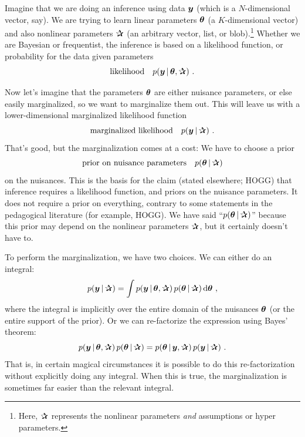 Imagine that we are doing an inference using data $\boldsymbol{y}$ (which is a
$N$-dimensional vector, say).
We are trying to learn linear parameters $\boldsymbol{\theta}$ (a $K$-dimensional vector)
and also nonlinear parameters $\bP$ (an arbitrary vector, list, or
blob).\footnote{Here, $\bP$ represents the nonlinear parameters \emph{and}
assumptions or hyper parameters.}
Whether we are Bayesian or frequentist, the inference is based on
a likelihood function, or probability for the data given parameters
\begin{equation}
\mbox{likelihood} \quad p(\vy\given\vtheta,\bP) ~ .
\end{equation}

Now let's imagine that the parameters $\boldsymbol{\theta}$ are either nuisance
parameters, or else easily marginalized, so we want to marginalize
them out.
This will leave us with a lower-dimensional marginalized likelihood
function
\begin{equation}
\mbox{marginalized likelihood} \quad p(\vy\given\bP) ~ .
\end{equation}
That's good, but the marginalization comes at a cost:
We have to choose a prior
\begin{equation}
\mbox{prior on nuisance parameters} \quad p(\vtheta\given\bP)
\end{equation}
on the nuisances.
This is the basis for the claim (stated elsewhere; HOGG) that
inference requires a likelihood function, and priors on the nuisance parameters.
It does not require a prior on everything, contrary to some statements
in the pedagogical literature (for example, HOGG).
We have said ``$p(\vtheta\given\bP)$'' because this prior may depend on
the nonlinear parameters $\bP$, but it certainly doesn't have to.

To perform the marginalization, we have two choices.
We can either do an integral:
\begin{equation}
p(\vy\given\bP) = \int p(\vy\given\vtheta,\bP)\,p(\vtheta\given\bP)\,\dd\vtheta
~ ,
\end{equation}
where the integral is implicitly over the entire domain of the
nuisances $\boldsymbol{\theta}$ (or the entire support of the prior).
Or we can re-factorize the expression using Bayes' theorem:
\begin{equation}
p(\vy\given\vtheta,\bP)\,p(\vtheta\given\bP)
 = p(\vtheta\given\vy,\bP)\,p(\vy\given\bP)
~ .
\end{equation}
That is, in certain magical circumstances it is possible to do this
re-factorization without explicitly doing any integral.
When this is true, the marginalization is sometimes far easier than
the relevant integral.

